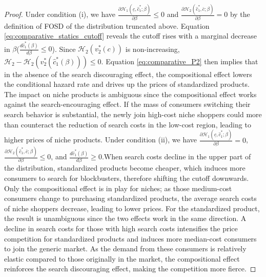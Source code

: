 \documentclass[14pt]{article}
\theoremstyle{plain}
\theoremstyle{definition}
\theoremstyle{remark}
\DeclareRobustCommand\1{\futurelet\oneNext\oneCheck}
\renewcommand{\H}{\mathcal{H}}
\begin{document}
\begin{proof}
Under condition (i), we have $\frac{\partial \H_1 (\underline{c},\hat{c}_1^*;\beta)}{\partial \beta}\leq 0$ and $\frac{\partial \H_2 (\hat{c}_1^*, \bar{c}; \beta)}{\partial \beta} =0$ by the definition of FOSD of the distribution truncated above. Equation \eqref{eq:comparative_statics_cutoff} reveals the cutoff rises with a marginal decrease in $\beta$($\frac{d\hat{c}_1^*(\beta)}{d\beta}\leq 0$). Since $\H_2(v_2^*(c))$ is non-increasing, $\H_2 -\H_2(v_2^*(\hat{c}_1^*(\beta)))\leq 0$. Equation \eqref{eq:comparative_P2} then implies that in the absence of the search discouraging effect, the compositional effect lowers the conditional hazard rate and drives up the prices of standardized products. The impact on niche products is ambiguous since the compositional effect works against the search-encouraging effect. If the mass of consumers switching their search behavior is substantial, the newly join high-cost niche shoppers could more than counteract the reduction of search costs in the low-cost region, leading to higher prices of  niche products. 
Under condition (ii), we have $\frac{\partial \H_1 (\underline{c},\hat{c}_1^*;\beta)}{\partial \beta}= 0$, $\frac{\partial \H_2 (\hat{c}_1^*, \bar{c}; \beta)}{\partial \beta} \leq0$, and $\frac{d\hat{c}_1^*(\beta)}{d\beta}\geq 0$.When search costs decline in the upper part of the distribution, standardized products become cheaper, which induces more consumers to search for blockbusters, therefore shifting the cutoff downwards. Only the compositional effect is in play for niches; as those medium-cost consumers change to purchasing standardized products, the average search costs of niche shoppers decrease, leading to lower prices. For the standardized product, the result is unambiguous since the two effects work in the same direction. A decline in search costs for those with high search costs intensifies the price competition for standardized products and induces more median-cost consumers to join the generic market. As the demand from these consumers is relatively elastic compared to those originally in the market, the compositional effect reinforces the search discouraging effect, making the competition more fierce.
\end{proof}
\end{document}
